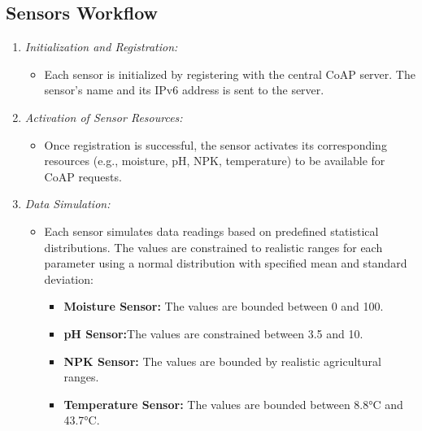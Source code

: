 \newpage




\subsection{Sensors Workflow}

\begin{enumerate}
    \item \textit{Initialization and Registration:}
    \begin{itemize}
        \item Each sensor is initialized by registering with the central CoAP server. The sensor's name and its IPv6 address is sent to the server.
    \end{itemize}

    \item \textit{Activation of Sensor Resources:}
    \begin{itemize}
        \item Once registration is successful, the sensor activates its corresponding resources (e.g., moisture, pH, NPK, temperature) to be available for CoAP requests.
    \end{itemize}
    
    \item \textit{Data Simulation:}
    \begin{itemize}
        \item Each sensor simulates data readings based on predefined statistical distributions. The values are constrained to realistic ranges for each parameter using a normal distribution with specified mean and standard deviation:
        \begin{itemize}
            \item \textbf{Moisture Sensor:} The values are bounded between 0 and 100.
            \item \textbf{pH Sensor:}The values are constrained between 3.5 and 10.
            \item \textbf{NPK Sensor:} The values are bounded by realistic agricultural ranges.
            \item \textbf{Temperature Sensor:} The values are bounded between 8.8°C and 43.7°C.
        \end{itemize}
    \end{itemize}
    

\end{enumerate}
